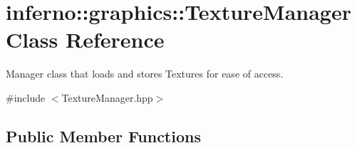 \hypertarget{classinferno_1_1graphics_1_1_texture_manager}{}\section{inferno\+:\+:graphics\+:\+:Texture\+Manager Class Reference}
\label{classinferno_1_1graphics_1_1_texture_manager}


Manager class that loads and stores Textures for ease of access.  




{\ttfamily \#include $<$Texture\+Manager.\+hpp$>$}

\subsection*{Public Member Functions}
